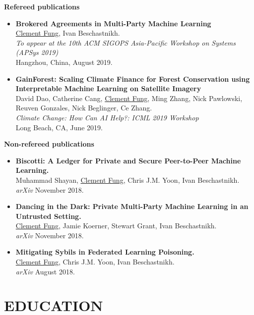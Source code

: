 \documentclass[10pt]{res} %
\begin{document}
\textbf{Refereed publications}
\begin{itemize}
\item \textbf{Brokered Agreements in Multi-Party Machine Learning} \\
\underline{Clement Fung}, Ivan Beschastnikh. \\
\emph{To appear at the 10th ACM SIGOPS Asia-Pacific Workshop on Systems (APSys 2019)} \\
Hangzhou, China, August 2019.

\item \textbf{GainForest: Scaling Climate Finance for Forest Conservation using Interpretable Machine Learning
    on Satellite Imagery} \\
David Dao, Catherine Cang, \underline{Clement Fung}, Ming Zhang, Nick Pawlowski,
    Reuven Gonzales, Nick Beglinger, Ce Zhang. \\
\emph{Climate Change: How Can AI Help?: ICML 2019 Workshop} \\
Long Beach, CA, June 2019.
\end{itemize}

\textbf{Non-refereed publications} 
\begin{itemize}
\item \textbf{Biscotti: A Ledger for Private and Secure Peer-to-Peer Machine Learning.} \\
Muhammad Shayan, \underline{Clement Fung}, Chris J.M. Yoon, Ivan Beschastnikh. \\ 
\emph{arXiv} November 2018.
%
\item \textbf{Dancing in the Dark: Private Multi-Party Machine Learning in an
Untrusted Setting.} \\
\underline{Clement Fung}, Jamie Koerner, Stewart Grant, Ivan Beschastnikh. \\ 
\emph{arXiv} November 2018.
%
\item \textbf{Mitigating Sybils in Federated Learning Poisoning.} \\ 
\underline{Clement Fung}, Chris J.M. Yoon, Ivan Beschastnikh. \\
\emph{arXiv} August 2018.
\end{itemize}


\section{EDUCATION} 
\end{document}
